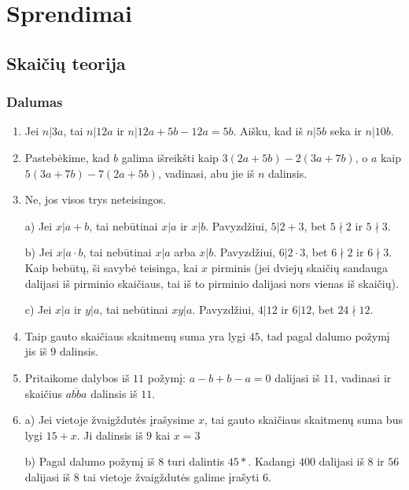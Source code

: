 \chapter{Sprendimai}
\section*{Skaičių teorija}
\subsection*{Dalumas}
\begin{enumerate}
\item
    Jei $n|3a$, tai $n|12a$ ir $n|12a + 5b - 12a = 5b$. Aišku, kad iš
    $n|5b$ seka ir $n|10b$.
\item
    Pastebėkime, kad $b$ galima išreikšti kaip $3(2a+5b) - 2(3a+7b)$, o
    $a$ kaip $5(3a+7b) - 7(2a+5b)$, vadinasi, abu jie iš $n$ dalinsis.
\item
    Ne, jos visos trys neteisingos.
    
    a) Jei $x|a+b$, tai nebūtinai $x|a$ ir $x|b$. Pavyzdžiui, $5|2+3$, bet
    $5\nmid 2$ ir $5\nmid 3$.
    
    b) Jei $x|a\cdot b$, tai nebūtinai $x|a$ arba $x|b$. Pavyzdžiui,
    $6|2\cdot 3$, bet $6\nmid 2$ ir $6\nmid 3$. Kaip bebūtų, ši savybė
    teisinga, kai $x$ pirminis (jei dviejų skaičių sandauga dalijasi iš
    pirminio skaičiaus, tai iš to pirminio dalijasi nors vienas iš
    skaičių).
    
    c) Jei $x|a$ ir $y|a$, tai nebūtinai $xy|a$. Pavyzdžiui, $4|12$ ir
    $6|12$, bet $24\nmid 12$.
\item
    Taip gauto skaičiaus skaitmenų suma yra lygi $45$, tad pagal dalumo
    požymį jis iš $9$ dalinsis.
\item
    Pritaikome dalybos iš $11$ požymį: $a-b +b-a =0$ dalijasi iš
    $11$, vadinasi ir skaičius $\overline{abba}$ dalinsis iš $11$.
\item
    a) Jei vietoje žvaigždutės įrašysime $x$, tai gauto skaičiaus
    skaitmenų suma bus lygi $15+x$. Ji dalinsis iš $9$ kai $x=3$
    
    b) Pagal dalumo požymį iš $8$ turi dalintis $45*$. Kadangi $400$
    dalijasi iš $8$ ir $56$ dalijasi iš $8$ tai vietoje žvaigždutės galime
    įrašyti $6$.
    

\end{enumerate}
